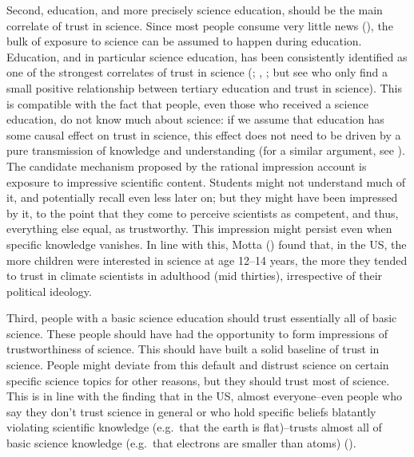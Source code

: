 \documentclass[
  jou,
  floatsintext,
  longtable,
  nolmodern,
  notxfonts,
  notimes,
  colorlinks=true,linkcolor=blue,citecolor=blue,urlcolor=blue]{apa7}
\begin{document}
Second, education, and more precisely science education, should be the
main correlate of trust in science. Since most people consume very
little news (), the bulk of exposure to science can be assumed to happen during
education. Education, and in particular science education, has been
consistently identified as one of the strongest correlates of trust in
science (;
,
; but
see 
who only find a small positive relationship between tertiary education
and trust in science). This is compatible with the fact that people,
even those who received a science education, do not know much about
science: if we assume that education has some causal effect on trust in
science, this effect does not need to be driven by a pure transmission
of knowledge and understanding (for a similar argument, see
). The
candidate mechanism proposed by the rational impression account is
exposure to impressive scientific content. Students might not understand
much of it, and potentially recall even less later on; but they might
have been impressed by it, to the point that they come to perceive
scientists as competent, and thus, everything else equal, as
trustworthy. This impression might persist even when specific knowledge
vanishes. In line with this, Motta
() found that, in
the US, the more children were interested in science at age 12--14
years, the more they tended to trust in climate scientists in adulthood
(mid thirties), irrespective of their political ideology.

Third, people with a basic science education should trust essentially
all of basic science. These people should have had the opportunity to
form impressions of trustworthiness of science. This should have built a
solid baseline of trust in science. People might deviate from this
default and distrust science on certain specific science topics for
other reasons, but they should trust most of science. This is in line
with the finding that in the US, almost everyone--even people who say
they don't trust science in general or who hold specific beliefs
blatantly violating scientific knowledge (e.g.~that the earth is
flat)--trusts almost all of basic science knowledge (e.g.~that electrons
are smaller than atoms)
().
\end{document}
